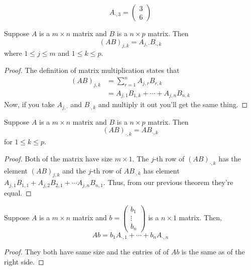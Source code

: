 \[
A_{\cdot, 3} = \begin{pmatrix}
     3 \\ 6  
\end{pmatrix}
 \]


\begin{theorem}
    Suppose $A$ is a $m \times n$ matrix and $B$ is a $n \times p$ matrix. Then
    \[ (AB)_{j,k} = A_{j, \cdot} B_{\cdot,k} \]
    where $1 \le j \le m$ and $1 \le k \le p$.
\end{theorem}

\begin{proof}
    The definition of matrix multiplication states that
    \begin{align*}
    (AB)_{j,k} &= \sum_{r=1}^{n} A_{j,r} B_{r,k} \\
    &= A_{j,1} B_{1,k} + \cdots + A_{j,n} B_{n,k}
    \end{align*} 
    Now, if you take $A_{j,\cdot}$ and $B_{\cdot,k}$ and multiply it out you'll get the same thing. 
\end{proof}

\begin{theorem}
    Suppose $A$ is a $m \times n$ matrix and $B$ is a $n \times p$ matrix. Then
    \[ (AB)_{\cdot, k} = A B_{\cdot, k} \]
    for $1 \le k \le p$.
\end{theorem}

\begin{proof}
    Both of the matrix have size $m \times 1$. The $j$-th row of $(AB)_{\cdot,k}$ has the element $(AB)_{j,k}$ 
    and the $j$-th row of $A B_{\cdot,k}$ has element $A_{j,1} B_{1,1} + A_{j,2} B_{2,1} + \cdots A_{j,n} B_{n,1}$.
    Thus, from our previous theorem they're equal.   
\end{proof}

\begin{theorem}
    Suppose $A$ is a $m \times n$ matrix and $b = \begin{pmatrix}
        b_1 \\ \vdots \\ b_n
    \end{pmatrix}$ is a $n \times 1$ matrix. Then, 
    \[ Ab = b_1 A_{\cdot,1} + \cdots + b_n A_{\cdot, n} \] 
\end{theorem}

\begin{proof}
    They both have same size and the entries of of $Ab$ is the same as of the right side.
\end{proof}

